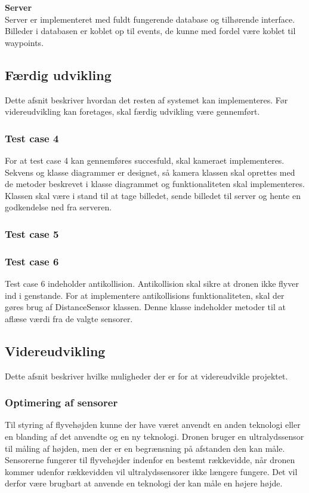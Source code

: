 \textbf{Server}\\
Server er implementeret med fuldt fungerende database og tilhørende interface. Billeder i databasen er koblet op til events, de kunne med fordel være koblet til waypoints.

\newpage
\subsection{Færdig udvikling}
Dette afsnit beskriver hvordan det resten af systemet kan implementeres. Før videreudvikling kan foretages, skal færdig udvikling være gennemført.

\subsubsection*{Test case 4}
For at test case 4 kan gennemføres succesfuld, skal kameraet implementeres. 
Sekvens og klasse diagrammer er designet, så kamera klassen skal oprettes med de metoder beskrevet i klasse diagrammet og funktionaliteten skal implementeres. Klassen skal være i stand til at tage billedet, sende billedet til server og hente en godkendelse ned fra serveren.

\subsubsection*{Test case 5}

\subsubsection*{Test case 6}
Test case 6 indeholder antikollision. Antikollision skal sikre at dronen ikke flyver ind i genstande. For at implementere antikollisions funktionaliteten, skal der gøres brug af DistanceSensor klassen. Denne klasse indeholder metoder til at aflæse værdi fra de valgte sensorer. 

\subsection{Videreudvikling}

Dette afsnit beskriver hvilke muligheder der er for at videreudvikle projektet. 

\subsubsection*{Optimering af sensorer}

Til styring af flyvehøjden kunne der have været anvendt en anden teknologi eller en blanding af det anvendte og en ny teknologi. Dronen bruger en ultralydssensor til måling af højden, men der er en begrænsning på afstanden den kan måle. Sensorerne fungerer til flyvehøjder indenfor en bestemt rækkevidde, når dronen kommer udenfor rækkevidden vil ultralydssensorer ikke længere fungere. Det vil derfor være brugbart at anvende en teknologi der kan måle en højere højde. 

